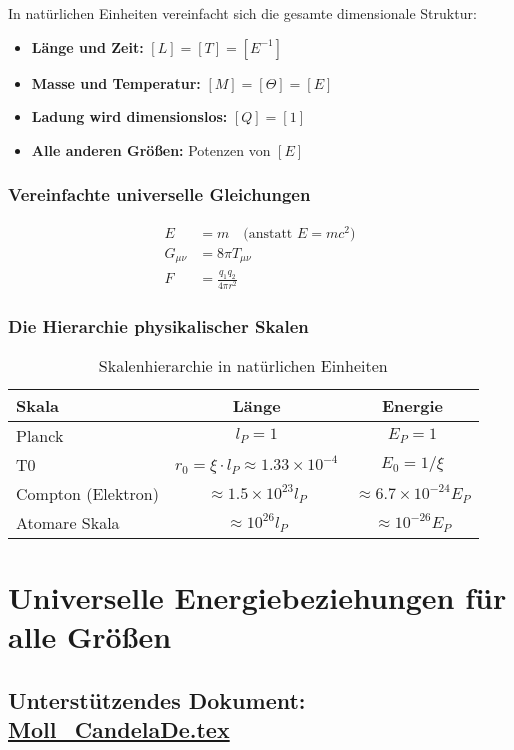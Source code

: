\documentclass[12pt,a4paper]{report}
\begin{document}
	In natürlichen Einheiten vereinfacht sich die gesamte dimensionale Struktur:
	\begin{itemize}
		\item \textbf{Länge und Zeit:} $[L] = [T] = [E^{-1}]$
		\item \textbf{Masse und Temperatur:} $[M] = [\Theta] = [E]$
		\item \textbf{Ladung wird dimensionslos:} $[Q] = [1]$
		\item \textbf{Alle anderen Größen:} Potenzen von $[E]$
	\end{itemize}
	
	\subsubsection{Vereinfachte universelle Gleichungen}
	\begin{align}
		E &= m \quad \text{(anstatt } E = mc^2\text{)} \\
		G_{\mu\nu} &= 8\pi T_{\mu\nu} \\
		F &= \frac{q_1 q_2}{4\pi r^2}
	\end{align}
	
	\subsubsection{Die Hierarchie physikalischer Skalen}
	\begin{table}[H]
		\centering
		\begin{tabular}{lcc}
			\toprule
			\textbf{Skala} & \textbf{Länge} & \textbf{Energie} \\
			\midrule
			Planck & $l_P = 1$ & $E_P = 1$ \\
			T0 & $r_0 = \xi \cdot l_P \approx 1.33 \times 10^{-4}$ & $E_0 = 1/\xi$ \\
			Compton (Elektron) & $\approx 1.5 \times 10^{23} l_P$ & $\approx 6.7 \times 10^{-24} E_P$ \\
			Atomare Skala & $\approx 10^{26} l_P$ & $\approx 10^{-26} E_P$ \\
			\bottomrule
		\end{tabular}
		\caption{Skalenhierarchie in natürlichen Einheiten}
		\label{tab:scale-hierarchy}
	\end{table}
	
	\section{Universelle Energiebeziehungen für alle Größen}
	\subsection{Unterstützendes Dokument: \href{https://github.com/jpascher/T0-Time-Mass-Duality/tree/main/2/pdf/Moll_CandelaDe.pdf}{Moll\_CandelaDe.tex}}
	
\end{document}
